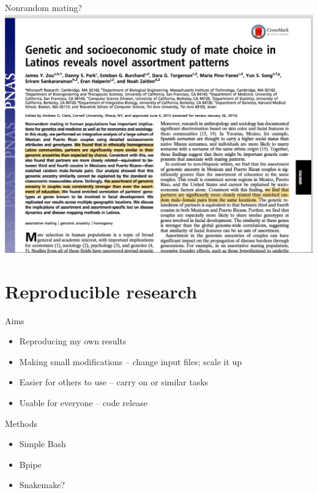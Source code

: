 \documentclass[11pt,xcolor=table]{beamer}
\begin{document}
\begin{frame}{Nonrandom mating?}
\centering
\includegraphics[width=1\textwidth]{pics/Zou_et_al.png}
\end{frame}

\section{Reproducible research}
\begin{frame}{Aims}
\begin{itemize}
\item Reproducing my own results 
\item Making small modifications -- change input files; scale it up
\item Easier for others to use -- carry on or similar tasks
\item Usable for everyone -- code release
\end{itemize}
\end{frame}
\begin{frame}{Methods}
\begin{itemize}
\item Simple Bash \href{https://github.com/yluo86/LIMAA/blob/master/sandbox/scripts/1kg_process.sh}{}
\item Bpipe \href{https://github.com/yluo86/LIMAA/blob/master/sandbox/scripts/1kg_process.pipebpipe}{}
\item Snakemake?
\end{itemize}
\end{frame}
\end{document}
